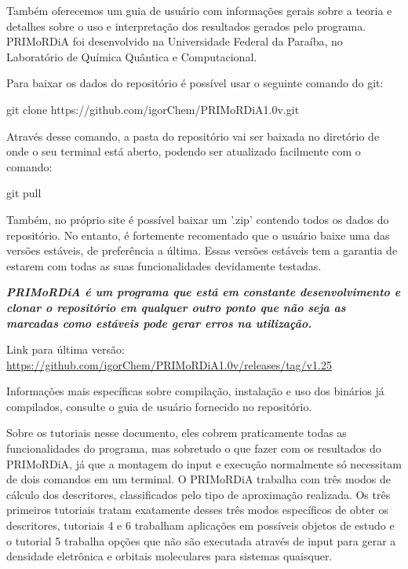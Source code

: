 \documentclass[a4paper,11pt]{refart}
\begin{document}
Também oferecemos um guia de usuário com informações gerais sobre a teoria e detalhes sobre o uso e interpretação dos resultados gerados pelo programa.  PRIMoRDiA foi desenvolvido na Universidade Federal da Paraíba, no Laboratório de Química Quântica e Computacional.

Para baixar os dados do repositório é possível usar o seguinte comando do git:

\hspace*{-\leftmarginwidth}
\begin{minipage}{\fullwidth}
	\begin{commandshell}git clone https://github.com/igorChem/PRIMoRDiA1.0v.git\end{commandshell}
\end{minipage}

Através desse comando, a pasta do repositório vai ser baixada no diretório de onde o seu terminal está aberto, podendo ser atualizado facilmente com o comando: 

\hspace*{-\leftmarginwidth}
\begin{minipage}{\fullwidth}
	\begin{commandshell}git pull\end{commandshell}
\end{minipage}

Também, no próprio site é possível baixar um '.zip' contendo todos os dados do repositório. 
No entanto, é fortemente recomentado que o usuário baixe uma das versões estáveis, de preferência a última. Essas versões estáveis tem a garantia de estarem com todas as suas funcionalidades devidamente testadas. 

\emph{\textbf{PRIMoRDiA é um programa que está em constante desenvolvimento e clonar o repositório em qualquer outro ponto que não seja as marcadas como estáveis pode gerar erros na utilização. }}

Link para última versão: \url{https://github.com/igorChem/PRIMoRDiA1.0v/releases/tag/v1.25}

Informações mais específicas sobre compilação, instalação e uso dos binários já compilados, consulte o guia de usuário fornecido no repositório. 

Sobre os tutoriais nesse documento, eles cobrem praticamente todas as funcionalidades do programa, mas sobretudo o que fazer com os resultados do PRIMoRDiA, já que a montagem do input e execução normalmente só necessitam de dois comandos em um terminal. O PRIMoRDiA trabalha com três modos de cálculo dos descritores, classificados pelo tipo de aproximação realizada. Os três primeiros tutoriais tratam exatamente desses três modos específicos de obter os descritores, tutoriais 4 e 6 trabalham aplicações em possíveis objetos de estudo e o tutorial 5 trabalha opções que não são executada através de input para gerar a densidade eletrônica e orbitais moleculares para sistemas quaisquer.
\end{document}
